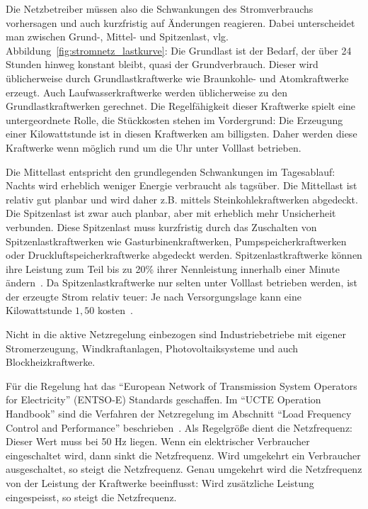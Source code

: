\documentclass[12pt,BCOR=8.5mm]{scrartcl}
\newcommand*\euro{\textup{\EUR}}
\begin{document}
\begin{enumerate}
    Die Netzbetreiber müssen also die Schwankungen des Stromverbrauchs
    vorhersagen und auch kurzfristig auf Änderungen reagieren. Dabei
    unterscheidet man zwischen Grund-, Mittel- und Spitzenlast, vlg.
    Abbildung~\ref{fig:stromnetz_lastkurve}: Die
    Grundlast ist der Bedarf, der über 24 Stunden hinweg konstant
    bleibt, quasi der Grundverbrauch. Dieser wird üblicherweise durch
    Grundlastkraftwerke wie Braunkohle- und Atomkraftwerke erzeugt. Auch
    Laufwasserkraftwerke werden üblicherweise zu den
    Grundlastkraftwerken gerechnet. Die Regelfähigkeit dieser Kraftwerke
    spielt eine untergeordnete Rolle, die Stückkosten stehen im
    Vordergrund: Die Erzeugung einer Kilowattstunde ist in diesen
    Kraftwerken am billigsten. Daher werden diese Kraftwerke wenn
    möglich rund um die Uhr unter Volllast betrieben.

    Die Mittellast entspricht den grundlegenden Schwankungen im
    Tagesablauf: Nachts wird erheblich weniger Energie verbraucht als
    tagsüber. Die Mittellast ist relativ gut planbar und
    wird daher z.B. mittels Steinkohlekraftwerken abgedeckt. Die
    Spitzenlast ist zwar auch planbar, aber mit erheblich mehr
    Unsicherheit verbunden. Diese Spitzenlast muss kurzfristig durch das
    Zuschalten von Spitzenlastkraftwerken wie Gasturbinenkraftwerken,
    Pumpspeicherkraftwerken oder Druckluftspeicherkraftwerke abgedeckt
    werden. Spitzenlastkraftwerke können ihre Leistung zum Teil bis zu
    20\% ihrer Nennleistung innerhalb einer Minute
    ändern~\cite{wikipedia10spitzenlast}\cite[S.
    108ff]{schwab06elektroenergiesysteme}. Da Spitzenlastkraftwerke nur
    selten unter Volllast betrieben werden, ist der erzeugte Strom
    relativ teuer: Je nach Versorgungslage kann eine Kilowattstunde
    \euro $1,50$ kosten~\cite{wikipedia10regelleistung}\cite[S.
    60]{schwab06elektroenergiesysteme}. 

    Nicht in die aktive Netzregelung einbezogen sind Industriebetriebe
    mit eigener Stromerzeugung, Windkraftanlagen, Photovoltaiksysteme
    und auch Blockheizkraftwerke. 

    Für die Regelung hat das "`European Network of Transmission System
    Operators for Electricity"' (ENTSO-E) Standards geschaffen. Im
    "`UCTE Operation Handbook"' sind die Verfahren der Netzregelung im
    Abschnitt "`Load Frequency Control and Performance"'
    beschrieben~\cite{entsoe10ucte}. Als Regelgröße dient die
    Netzfrequenz: Dieser Wert muss bei 50 Hz liegen. Wenn ein
    elektrischer Verbraucher eingeschaltet wird, dann sinkt die
    Netzfrequenz. Wird umgekehrt ein Verbraucher ausgeschaltet, so
    steigt die Netzfrequenz. Genau umgekehrt wird die Netzfrequenz von
    der Leistung der Kraftwerke beeinflusst: Wird zusätzliche Leistung
    eingespeisst, so steigt die Netzfrequenz.


\end{enumerate}
\end{document}
